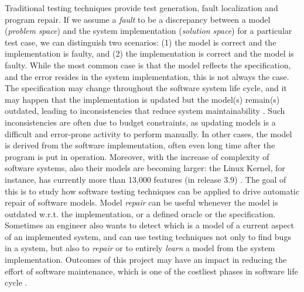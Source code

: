 Traditional testing techniques provide test generation, fault localization and program repair. %
If we assume a \textit{fault} to be a discrepancy between a model (\textit{problem space}) and the system implementation (\textit{solution space}) for a particular test case, we can distinguish two scenarios: (1) the model is correct and the implementation is faulty, and (2) the implementation is correct and the model is faulty.
While the most common case is that the model reflects the specification, and the error resides in the system implementation, this is not always the case.
The specification may change throughout the software system life cycle, and it may happen that the implementation is updated but the model(s) remain(s) outdated, leading to inconsistencies that reduce system maintainability \cite{rost2013software}. %
Such inconsistencies are often due to budget constraints, as updating models is a difficult and error-prone activity to perform manually. %
In other cases, the model is derived from the software implementation, often even long time after the program is put in operation. 
Moreover, with the increase of complexity of software systems, also their models are becoming larger: the Linux Kernel, for instance, has currently more than 13,000 features (in release 3.9) \cite{passos2018study}.
The goal of this  
is to study how software testing techniques can be applied to drive automatic repair of software models.
Model \textit{repair} can be useful whenever the model is outdated w.r.t. the implementation, or a defined oracle or the specification.
Sometimes an engineer also wants to detect which is a model of a current aspect of an implemented system, and can use testing techniques not only to find bugs in a system, but also to \textit{repair} or to entirely \textit{learn} a model from the system implementation. 
Outcomes of this project may have an impact in reducing the effort of software maintenance, which is one of the costliest phases in software life cycle \cite{zarnekow2005distribution}.

